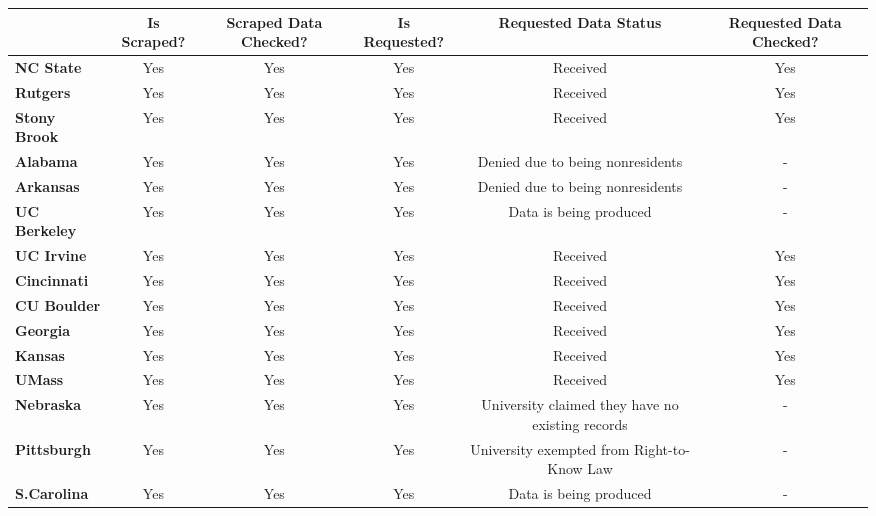 \begin{tabular*}{\linewidth}{@{\extracolsep{\fill} } lccccc}%
\textbf{}&\textbf{Is Scraped?}&\textbf{Scraped Data Checked?}&\textbf{Is Requested?}&\textbf{Requested Data Status}&\textbf{Requested Data Checked?}\\%
\hline%
\bfseries NC State&Yes&Yes&Yes&Received&Yes\\%
\bfseries Rutgers&Yes&Yes&Yes&Received&Yes\\%
\bfseries Stony Brook&Yes&Yes&Yes&Received&Yes\\%
\bfseries Alabama&Yes&Yes&Yes&Denied due to being nonresidents&{-}\\%
\bfseries Arkansas&Yes&Yes&Yes&Denied due to being nonresidents&{-}\\%
\bfseries UC Berkeley&Yes&Yes&Yes&Data is being produced&{-}\\%
\bfseries UC Irvine&Yes&Yes&Yes&Received&Yes\\%
\bfseries Cincinnati&Yes&Yes&Yes&Received&Yes\\%
\bfseries CU Boulder&Yes&Yes&Yes&Received&Yes\\%
\bfseries Georgia&Yes&Yes&Yes&Received&Yes\\%
\bfseries Kansas&Yes&Yes&Yes&Received&Yes\\%
\bfseries UMass&Yes&Yes&Yes&Received&Yes\\%
\bfseries Nebraska&Yes&Yes&Yes&University claimed they have no existing records&{-}\\%
\bfseries Pittsburgh&Yes&Yes&Yes&University exempted from Right{-}to{-}Know Law&{-}\\%
\bfseries S.Carolina&Yes&Yes&Yes&Data is being produced&{-}\\%
\hline%
\end{tabular*}